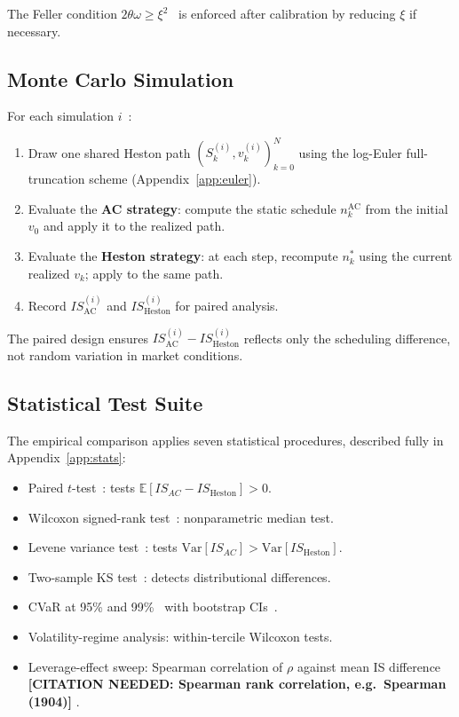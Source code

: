 \documentclass[11pt]{article}
\newcommand{\needscite}[1]{%
  {\color{red}\textbf{[CITATION NEEDED: #1]}}%
}
\begin{document}
The Feller condition $2\theta\omega \geq \xi^2$~\cite{cox1985theory} is enforced after calibration
by reducing $\xi$ if necessary.

\subsection{Monte Carlo Simulation}

For each simulation $i$~\cite{glasserman2004monte}:
\begin{enumerate}[label=(\roman*)]
\item Draw one shared Heston path $(S_k^{(i)}, v_k^{(i)})_{k=0}^N$ using the log-Euler
      full-truncation scheme (Appendix~\ref{app:euler}).
\item Evaluate the \textbf{AC strategy}: compute the static schedule $n_k^{\text{AC}}$ from the
      initial $v_0$ and apply it to the realized path.
\item Evaluate the \textbf{Heston strategy}: at each step, recompute $n_k^{*}$ using the current
      realized $v_k$; apply to the same path.
\item Record $IS_{\text{AC}}^{(i)}$ and $IS_{\text{Heston}}^{(i)}$ for paired analysis.
\end{enumerate}

The paired design ensures $IS_{\text{AC}}^{(i)} - IS_{\text{Heston}}^{(i)}$ reflects only the
scheduling difference, not random variation in market conditions.

\subsection{Statistical Test Suite}

The empirical comparison applies seven statistical procedures, described fully in
Appendix~\ref{app:stats}:
\begin{itemize}
\item Paired $t$-test~\cite{lehmann2005testing}: tests $\mathbb{E}[IS_{AC} - IS_{\text{Heston}}] > 0$.
\item Wilcoxon signed-rank test~\cite{lehmann2005testing}: nonparametric median test.
\item Levene variance test~\cite{levene1960robust,brown1974robust}: tests $\mathrm{Var}[IS_{AC}] > \mathrm{Var}[IS_{\text{Heston}}]$.
\item Two-sample KS test~\cite{kolmogorov1933sulla,smirnov1948table}: detects distributional differences.
\item CVaR at 95\% and 99\%~\cite{rockafellar2000cvar} with bootstrap CIs~\cite{efron1993bootstrap}.
\item Volatility-regime analysis: within-tercile Wilcoxon tests.
\item Leverage-effect sweep: Spearman correlation of $\rho$ against mean IS difference~\needscite{Spearman rank correlation, e.g.\ Spearman (1904)}.
\end{itemize}
\end{document}
